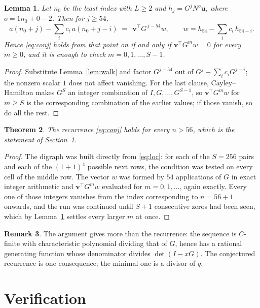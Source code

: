 \documentclass[11pt,a4paper]{article}
\theoremstyle{plain}
\newtheorem{theorem}{Theorem}
\newtheorem{lemma}[theorem]{Lemma}
\theoremstyle{definition}
\newtheorem{remark}[theorem]{Remark}
\begin{document}
\begin{lemma}\label{lem:crit}
Let $n_0$ be the least index with $L\ge2$ and $h_j=G^{j}N^{o}\mathbf{u}$, where
$o=1n_0+0-2$. Then for $j\ge54$,
\[
a(n_0+j)-\sum_i c_i\,a(n_0+j-i)\;=\;\,\mathbf{v}^{\!\top}G^{\,j-54}w,
\qquad w=h_{54}-\sum_i c_i\,h_{54-i} .
\]
Hence \eqref{eq:conj} holds from that point on if and only if
$\mathbf{v}^{\!\top}G^{m}w=0$ for every $m\ge0$, and it is enough to check
$m=0,1,\dots,S-1$.
\end{lemma}

\begin{proof}
Substitute Lemma~\ref{lem:walk} and factor $G^{j-54}$ out of
$G^{j}-\sum_ic_iG^{j-i}$; the nonzero scalar $1$ does not affect
vanishing. For the last clause, Cayley--Hamilton makes $G^{S}$ an integer combination of
$I,G,\dots,G^{S-1}$, so $\mathbf{v}^{\!\top}G^{m}w$ for $m\ge S$ is the corresponding
combination of the earlier values; if those vanish, so do all the rest.
\end{proof}

\begin{theorem}
The recurrence \eqref{eq:conj} holds for every $n>56$, which is the statement of
Section~1.
\end{theorem}

\begin{proof}
The digraph was built directly from \eqref{eq:loc}: for each of the $S=256$ pairs and each
of the $(1+1)^{4}$ possible next rows, the condition was tested on every cell of
the middle row. The vector $w$ was formed by $54$ applications of $G$ in exact integer
arithmetic and $\mathbf{v}^{\!\top}G^{m}w$ evaluated for $m=0,1,\dots$, again exactly.
Every one of those integers vanishes from the index corresponding to $n=56+1$ onwards,
and the run was continued until $S+1$ consecutive zeros had been seen, which by
Lemma~\ref{lem:crit} settles every larger $m$ at once.
\end{proof}

\begin{remark}
The argument gives more than the recurrence: the sequence is $C$-finite with characteristic
polynomial dividing that of $G$, hence has a rational generating function whose denominator
divides $\det(I-xG)$. The conjectured recurrence is one consequence; the minimal one is a
divisor of $q$.
\end{remark}

\section{Verification}
\end{document}
